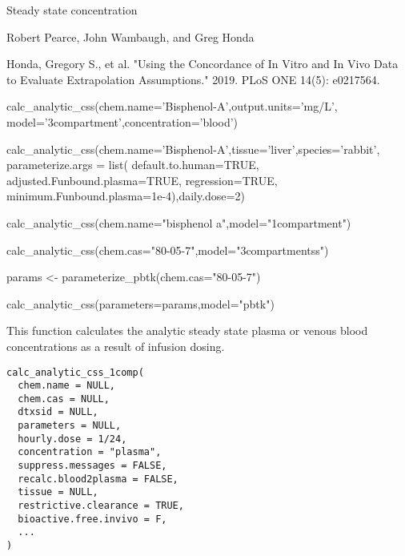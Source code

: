 \documentclass[a4paper]{book}
\begin{document}
%
\begin{Value}
Steady state concentration
\end{Value}
%
\begin{Author}\relax
Robert Pearce, John Wambaugh, and Greg Honda
\end{Author}
%
\begin{References}\relax
Honda, Gregory S., et al. "Using the Concordance of In Vitro and 
In Vivo Data to Evaluate Extrapolation Assumptions." 2019. PLoS ONE 14(5): e0217564.
\end{References}
%
\begin{Examples}
\begin{ExampleCode}
calc_analytic_css(chem.name='Bisphenol-A',output.units='mg/L',
                 model='3compartment',concentration='blood')

calc_analytic_css(chem.name='Bisphenol-A',tissue='liver',species='rabbit',
                 parameterize.args = list(
                                default.to.human=TRUE,
                                adjusted.Funbound.plasma=TRUE,
                                regression=TRUE,
                                minimum.Funbound.plasma=1e-4),daily.dose=2)

calc_analytic_css(chem.name="bisphenol a",model="1compartment")

calc_analytic_css(chem.cas="80-05-7",model="3compartmentss")

params <- parameterize_pbtk(chem.cas="80-05-7") 

calc_analytic_css(parameters=params,model="pbtk")

\end{ExampleCode}
\end{Examples}
%
\begin{Description}\relax
This function calculates the analytic steady state plasma or venous blood 
concentrations as a result of infusion dosing.
\end{Description}
%
\begin{Usage}
\begin{verbatim}
calc_analytic_css_1comp(
  chem.name = NULL,
  chem.cas = NULL,
  dtxsid = NULL,
  parameters = NULL,
  hourly.dose = 1/24,
  concentration = "plasma",
  suppress.messages = FALSE,
  recalc.blood2plasma = FALSE,
  tissue = NULL,
  restrictive.clearance = TRUE,
  bioactive.free.invivo = F,
  ...
)
\end{verbatim}
\end{Usage}
\end{document}
